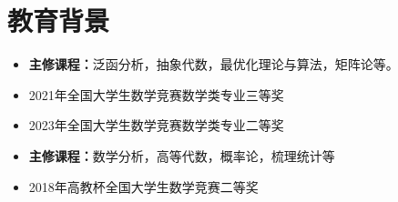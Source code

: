 \documentclass{resume}
\begin{document}





\section{教育背景}




\begin{itemize} [parsep=1ex]
  \item \textbf{主修课程：}泛函分析，抽象代数，最优化理论与算法，矩阵论等。
  \item 2021年全国大学生数学竞赛数学类专业三等奖
  \item 2023年全国大学生数学竞赛数学类专业二等奖
\end{itemize}


\begin{itemize} [parsep=1ex]
  \item \textbf{主修课程：}数学分析，高等代数，概率论，梳理统计等
  \item 2018年高教杯全国大学生数学竞赛二等奖
\end{itemize}
\end{document}
